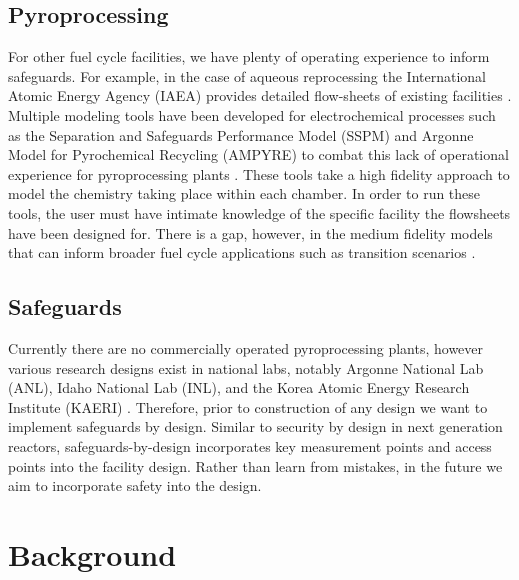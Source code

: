 \subsection{Pyroprocessing}
For other fuel cycle facilities, we have plenty of operating experience to inform safeguards. For example, in the case of aqueous reprocessing
the International Atomic Energy Agency (IAEA) provides detailed flow-sheets of existing facilities \cite{international_atomic_energy_agency_implications_2004}. Multiple modeling
tools have been developed for electrochemical processes such as the Separation and Safeguards Performance Model (SSPM) and Argonne Model for Pyrochemical Recycling (AMPYRE) to combat this lack of operational experience for pyroprocessing plants \cite{maggos_update_2015}. 
These tools take a high fidelity approach to model the
chemistry taking place within each chamber. In order to run these tools, the user must have intimate knowledge of the specific facility the flowsheets have
been designed for. There is a gap, however, in the medium fidelity models that can inform broader fuel cycle applications such as transition scenarios \cite{borrelli_approaches_2017}. 

\subsection{Safeguards}
Currently there are no commercially operated pyroprocessing plants, however various research designs exist in national labs,
notably Argonne National Lab (ANL), Idaho National Lab (INL), and the Korea Atomic Energy Research Institute (KAERI) \cite{michael_f._simpson_developments_2012, lee_advanced, frigo_conceptual_2003}. 
Therefore, prior to construction of any design we 
want to implement safeguards by design. Similar to security by design in next generation reactors, safeguards-by-design incorporates key measurement 
points and access points into the facility design. Rather than learn from mistakes, in the future we aim to incorporate safety 
into the design.

\section{Background}
